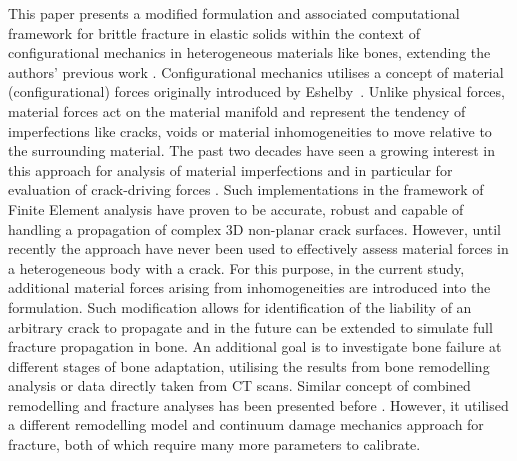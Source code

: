 \documentclass[11pt]{acmeArticle}
\numberwithin{equation}{section}
\begin{document}
This paper presents a modified formulation and associated computational framework for brittle fracture in elastic solids within the context of configurational mechanics in heterogeneous materials like bones, extending the authors' previous work \citep{kaczmarczyk2017energy}. Configurational mechanics utilises a concept of material (configurational) forces originally introduced by Eshelby~\citep{eshelby1951force}. Unlike physical forces, material forces act on the material manifold and represent the tendency of imperfections like cracks, voids or material inhomogeneities to move relative to the surrounding material. The past two decades have seen a growing interest in this approach for analysis of material imperfections \citep{maugin2016configurational} and in particular for evaluation of crack-driving forces \citep{steinmann2001application, ozencc2016configurational, kaczmarczyk2017energy}. Such implementations in the framework of Finite Element analysis have proven to be accurate, robust and capable of handling a propagation of complex 3D non-planar crack surfaces. However, until recently the approach have never been used to effectively assess material forces in a heterogeneous body with a crack. For this purpose, in the current study, additional material forces arising from inhomogeneities are introduced into the formulation. Such modification allows for identification of the liability of an arbitrary crack to propagate and in the future can be extended to simulate full fracture propagation in bone. An additional goal is to investigate bone failure at different stages of bone adaptation, utilising the results from bone remodelling analysis or data directly taken from CT scans. Similar concept of combined remodelling and fracture analyses has been presented before \citep{hambli2013integrated}. However, it utilised a different remodelling model and continuum damage mechanics approach for fracture, both of which require many more parameters to calibrate. 
\end{document}

